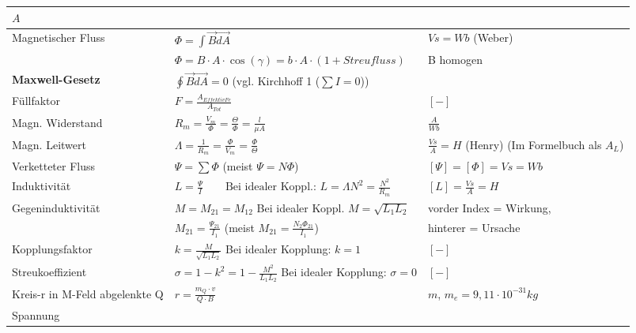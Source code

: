 \begin{tabular}[c]{ | p{5cm} | p{8cm} | p{4cm} | }
            $A$ \\
            \hline
            Magnetischer Fluss &
            $\Phi = \int \vec{B} \vec{dA}$ &
            $Vs = Wb$ (Weber) \\
            &
            $\Phi = B \cdot A \cdot \cos(\gamma)=b \cdot A \cdot (1+Streufluss)$ &
            B homogen \\
            \hline
            \textbf{Maxwell-Gesetz} &
            $\oint \vec{B} \vec{dA} = 0$ (vgl. Kirchhoff 1 ($\sum I = 0$)) &
            \\
            \hline
            Füllfaktor &
            $F=\frac{A_{Effektiv Fe}}{A_{Tot}}$ &
            $[-]$ \\
            \hline
            Magn. Widerstand &
            $R_m = \frac{V_m}{\Phi} = \frac{\Theta}{\Phi} = \frac{l}{\mu A} $ &
            $\frac{A}{Wb}$ \\
            \hline
            Magn. Leitwert &
            $\Lambda = \frac{1}{R_m} = \frac{\Phi}{V_m}=\frac{\Phi}{\Theta}$ &
            $\frac{Vs}{A} = H$ (Henry) (Im Formelbuch als $A_L$) \\
            \hline
            Verketteter Fluss &
            $\Psi = \sum \Phi $ (meist $\Psi = N \Phi$) &
            $[\Psi] = [\Phi] = Vs = Wb$ \\
            \hline
            Induktivität &
            $L = \frac{\Psi}{I}  \qquad \text{Bei idealer Koppl.: } L = \Lambda N^2 = \frac{N^2}{R_m} $ &
            $[L] = \frac{Vs}{A} = H$ \\
            \hline
            Gegeninduktivität &
            $M = M_{21} = M_{12}$ Bei idealer Koppl. $M = \sqrt{L_1 L_2}$ &
            vorder Index = Wirkung, \\
            &
            $M_{21} = \frac{\Psi_{21}}{I_1}$  (meist $M_{21} = \frac{N_2 \Phi_{21}}{I_1}$) &
            hinterer = Ursache \\
            \hline
            Kopplungsfaktor &
            $k = \frac{M}{\sqrt{L_1 L_2}}$ Bei idealer Kopplung: $k = 1$ &
            $[-]$ \\
            \hline
            Streukoeffizient &
            $\sigma = 1 - k^2 = 1 -\frac{M^2}{L_1 L_2}$ Bei idealer Kopplung: $\sigma = 0$ &
            $[-]$ \\
            \hline
            Kreis-r in M-Feld abgelenkte Q &
            $r = \frac{m_Q \cdot v}{Q \cdot B}$ &
            $m$, $ m_e = 9,11 \cdot 10^{-31} kg$ \\
            \hline
            Spannung &

\end{tabular}

